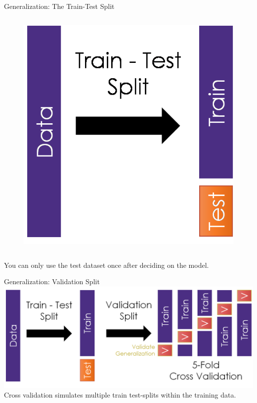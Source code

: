 \documentclass[aspectratio=169]{../latex_main/tntbeamer}  %
\begin{document}
\begin{frame}{Generalization: The Train-Test Split}
\begin{columns}
	        
	       \begin{column}{.5\textwidth}
	                \begin{figure}
	                    \includegraphics[scale=.5]{Bild3}
	                \end{figure}
	        \end{column}
	    \end{columns}
	    \bigskip
	    You can only use the test dataset once after deciding on the model.

	\end{frame}
	
	\begin{frame}{Generalization: Validation Split}
	    \includegraphics[scale=.43]{Bild4}\\
	    Cross validation simulates multiple train test-splits within the training data.

	\end{frame}
	
\end{document}
